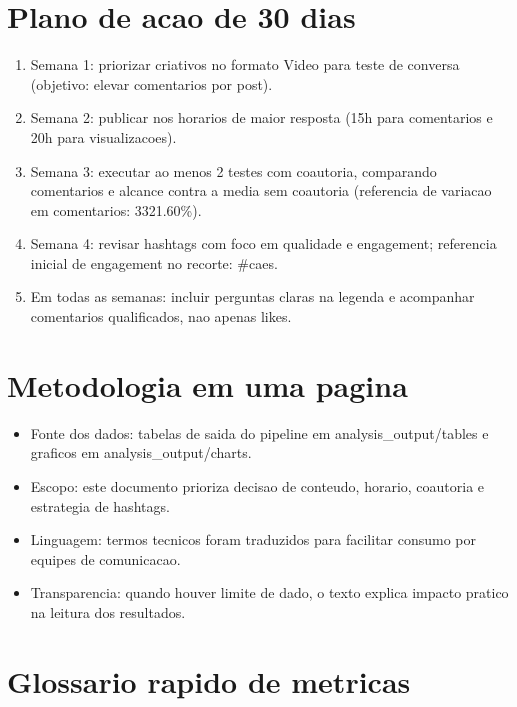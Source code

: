 \documentclass[12pt,a4paper]{article}
\begin{document}
\section{Plano de acao de 30 dias}
\begin{enumerate}
\item Semana 1: priorizar criativos no formato Video para teste de conversa (objetivo: elevar comentarios por post).
\item Semana 2: publicar nos horarios de maior resposta (15h para comentarios e 20h para visualizacoes).
\item Semana 3: executar ao menos 2 testes com coautoria, comparando comentarios e alcance contra a media sem coautoria (referencia de variacao em comentarios: 3321.60\%).
\item Semana 4: revisar hashtags com foco em qualidade e engagement; referencia inicial de engagement no recorte: \#caes.
\item Em todas as semanas: incluir perguntas claras na legenda e acompanhar comentarios qualificados, nao apenas likes.
\end{enumerate}
\section{Metodologia em uma pagina}
\begin{itemize}
\item Fonte dos dados: tabelas de saida do pipeline em analysis\_output/tables e graficos em analysis\_output/charts.
\item Escopo: este documento prioriza decisao de conteudo, horario, coautoria e estrategia de hashtags.
\item Linguagem: termos tecnicos foram traduzidos para facilitar consumo por equipes de comunicacao.
\item Transparencia: quando houver limite de dado, o texto explica impacto pratico na leitura dos resultados.
\end{itemize}
\section{Glossario rapido de metricas}
\end{document}
